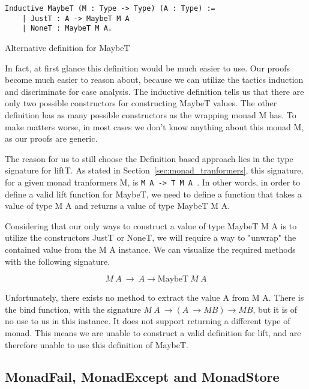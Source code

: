 \begin{listing}
\begin{verbatim}
Inductive MaybeT (M : Type -> Type) (A : Type) :=
    | JustT : A -> MaybeT M A
    | NoneT : MaybeT M A.
\end{verbatim}
\caption{Alternative definition for MaybeT}
\label{lst:alternative_maybeT}
\end{listing}

In fact, at first glance this definition would be much easier to use. Our
proofs become much easier to reason about, because we can utilize the tactics
induction and discriminate for case analysis. The inductive definition tells us
that there are only two possible constructors for constructing MaybeT values.
The other definition has as many possible constructors as the wrapping monad M
has. To make matters worse, in most cases we don't know anything about this
monad M, as our proofs are generic.

The reason for us to still choose the Definition based approach lies in the
type signature for liftT. As stated in Section~\ref{sec:monad_tranformers},
this signature, for a given monad tranformers M, is 
\texttt{M A -> T M A }. In other words, in order to define a valid
lift function for MaybeT, we need to define a function that takes a value of
type M A and returns a value of type MaybeT M A.

Considering that our only ways to construct a value of type MaybeT M A is to
utilize the constructors JustT or NoneT, we will require a way to "unwrap" the
contained value from the M A instance. We can visualize the required methods
with the following signature.

\begin{equation}
    M\ A\ \rightarrow\ A \rightarrow \text{MaybeT}\ M\ A
\end{equation}

Unfortunately, there exists no method to extract the value A from M A. There is
the bind function, with the signature 
$M\ A\ \rightarrow (A\ \rightarrow M B) \rightarrow M B$, but it is of no use
to us in this instance. It does not support returning a different type of
monad. This means we are unable to construct a valid definition for lift, and
are therefore unable to use this definition of MaybeT.

\subsection{MonadFail, MonadExcept and MonadStore}

